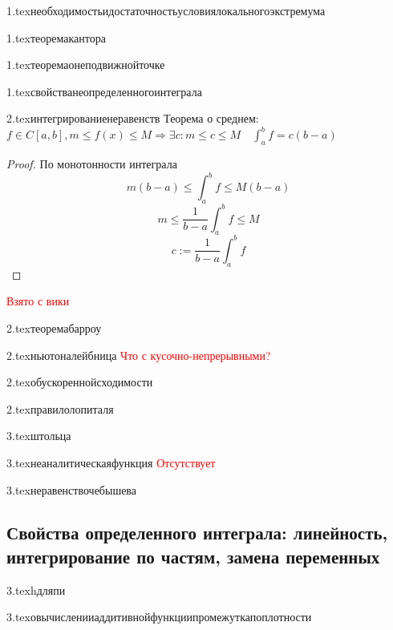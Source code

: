 {1.tex}{необходимостьидостаточностьусловиялокальногоэкстремума}

{1.tex}{теоремакантора}

{1.tex}{теоремаонеподвижнойточке}

{1.tex}{свойстванеопределенногоинтеграла}
\label{integralproperties}

{2.tex}{интегрированиенеравенств}
Теорема о среднем: $f\in C[a,b], m\le f(x) \le M \Rightarrow \exists c : m\le c \le M \quad \int_a^b f = c(b-a)$
\begin{proof}
    По монотонности интеграла
    $$m(b-a)\le \int_a^b f \le M(b-a)$$
    $$m\le \frac{1}{b-a}\int_a^b f \le M$$
    $$c := \frac{1}{b-a}\int_a^b f$$
\end{proof}
\textcolor{red}{Взято с вики}

{2.tex}{теоремабарроу}

{2.tex}{ньютоналейбница}
\textcolor{red}{Что с кусочно-непрерывными?}

{2.tex}{обускореннойсходимости}

{2.tex}{правилолопиталя}

{3.tex}{штольца}

{3.tex}{неаналитическаяфункция}
\textcolor{red}{Отсутствует}

{3.tex}{неравенствочебышева}

\subsection{Свойства определенного интеграла: линейность, интегрирование по частям, замена переменных}

{3.tex}{hдляпи}

{3.tex}{овычисленииаддитивнойфункциипромежуткапоплотности}

